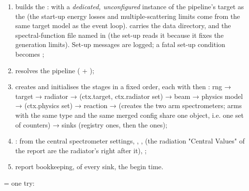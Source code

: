\begin{enumerate}
\item builds the :  with a \emph{dedicated, unconfigured}
instance of the pipeline's target as the  (the start-up energy losses and multiple-scattering
limits come from the same target model as the event loop).  carries the data directory,
 and the spectral-function file named in  (the set-up reads it
because it fixes the generation limits). Set-up messages are logged; a fatal set-up condition becomes
;
\item resolves the pipeline ( + );
\item creates and initialises the stages in a fixed order, each with  then :
rng → target → radiator → (ctx.\allowbreak{}target,\allowbreak{} ctx.\allowbreak{}radiator set) → beam → physics model → (ctx.\allowbreak{}physics set) → reaction →
 (creates the two arm spectrometers; arms with the same type and the same merged config share one
object, i.e. one set of counters) → sinks (registry ones, then the  ones);
\item {}:  from the central spectrometer settings, , ,
 (the radiation "Central Values" of the report are the radiator's  right after
it), ;
\item report bookkeeping,\allowbreak{}  of every sink, the begin time.
\end{enumerate}
\textbf{} = one try:

